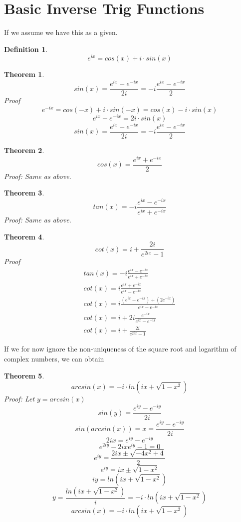 \documentclass[a4paper]{article}
\author{Emil Kerimov}
\numberwithin{equation}{subsection}
\newtheorem{theorem}{Theorem}[section]
\newtheorem{definition}{Definition}[section]
\begin{document}
\section{Basic Inverse Trig Functions}
If we assume we have this as a given.

\begin{definition}
$$e^{ix} = cos(x) + i \cdot sin(x)$$
\end{definition}


\begin{theorem}
$$sin(x) = \frac{e^{ix} - e^{-ix}}{2i} =-i \frac{e^{ix} - e^{-ix}}{2}$$
Proof
$$e^{-ix} = cos(-x) + i \cdot sin(-x) = cos(x) - i \cdot sin(x)$$
$$e^{ix} - e^{-ix} = 2i \cdot sin(x)$$
$$sin(x) = \frac{e^{ix} - e^{-ix}}{2i} =-i \frac{e^{ix} - e^{-ix}}{2} $$
\end{theorem}

\begin{theorem}
$$cos(x) = \frac{e^{ix} + e^{-ix}}{2}$$
Proof: Same as above. 
\end{theorem}

\begin{theorem}
$$tan(x) = -i \frac{e^{ix} - e^{-ix}}{e^{ix} + e^{-ix}}$$
Proof: Same as above. 
\end{theorem}

\begin{theorem}
$$ cot(x) = i +  \frac{2i}{e^{2ix} -1} $$
Proof
\begin{gather*}
tan(x) = -i \frac{e^{ix} - e^{-ix}}{e^{ix} + e^{-ix}}
\\
cot(x) = i \frac{e^{ix} + e^{-ix}}{e^{ix} - e^{-ix}}
\\
cot(x) = i \frac{(e^{ix} - e^{-ix}) +( 2e^{-ix})}{e^{ix} - e^{-ix}}
\\
cot(x) = i  + 2i \frac{e^{-ix}}{e^{ix} - e^{-ix}}
\\
cot(x) = i  + \frac{2i}{e^{2ix} - 1}
\end{gather*}
\end{theorem}

If we for now ignore the non-uniqueness of the square root and logarithm of complex numbers, we can obtain 
\begin{theorem}
$$arcsin(x) = -i \cdot ln( ix + \sqrt{1- x^2} )$$
Proof: Let $y=arcsin(x)$
$$sin(y) = \frac{e^{iy} - e^{-iy}}{2i}$$
$$sin(arcsin(x)) = x = \frac{e^{iy} - e^{-iy}}{2i}$$
$$ 2i x = e^{iy} - e^{-iy}$$
$$ e^{2iy} - 2ix e^{iy} - 1 = 0$$
$$ e^{iy} = \frac{2ix \pm \sqrt{-4x^2 + 4}}{2}$$
$$ e^{iy} = ix \pm \sqrt{1 -x^2}$$
$$ iy =  ln( ix + \sqrt{1- x^2} )$$
$$ y = \frac{ln( ix + \sqrt{1- x^2})}{i} = -i \cdot ln( ix + \sqrt{1- x^2})$$
$$arcsin(x) = -i \cdot ln( ix + \sqrt{1- x^2} )$$
\end{theorem}
\end{document}
